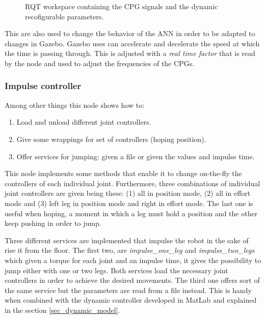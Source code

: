 \begin{figure}[tb]
    \centering
    \caption{RQT workspace containing the CPG signals and the dynamic recofigurable parameters.}
    \label{fig:rqt_interface}
\end{figure}

This are also used to change the behavior of the ANN in order to be adapted to changes in Gazebo.
Gazebo uses can accelerate and decelerate the speed at which the time is passing through.
This is adjusted with a \textit{real time factor} that is read by the node and used to adjust the frequencies of the CPGs.

\subsubsection{Impulse controller} %
\label{ssub:impulse_controller}
Among other things this node shows how to:
\begin{enumerate}
    \item Load and unload different joint controllers.
    \item Give some wrappings for set of controllers (hoping position).
    \item Offer services for jumping: given a file or given the values and impulse time.
\end{enumerate}
This node implements some methods that enable it to change on-the-fly the controllers of each individual joint.
Furthermore, three combinations of individual joint controllers are given being these: (1) all in position mode, (2) all in effort mode and (3) left leg in position mode and right in effort mode.
The last one is useful when hoping, a moment in which a leg must hold a position and the other keep pushing in order to jump.

Three different services are implemented that impulse the robot in the sake of rise it from the floor.
The first two, are \textit{impulse\_one\_leg} and \textit{impulse\_two\_legs} which given a torque for each joint and an impulse time, it gives the possibility to jump either with one or two legs.
Both services load the necessary joint controllers in order to achieve the desired movements.
The third one offers sort of the same service but the parameters are read from a file instead.
This is handy when combined with the dynamic controller developed in MatLab and explained in the section \ref{sec_dynamic_model}.


